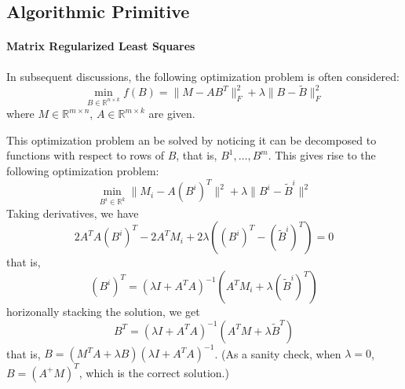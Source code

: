 \documentclass{article}
\def\R{\mathbb{R}}
\begin{document}
\subsection{Algorithmic Primitive}
\paragraph{Matrix Regularized Least Squares} In subsequent discussions, the following optimization problem is often considered:
\[ \min_{B \in \R^{n \times k}} f(B) = \| M - A B^T \|_F^2 + \lambda \| B - \tilde{B} \|_F^2 \]
where $M \in \R^{m \times n}$, $A \in \R^{m \times k}$ are given.

This optimization problem an be solved by noticing it can be decomposed to functions with
respect to rows of $B$, that is, $B^{1}, \ldots, B^{m}$.
This gives rise to the following optimization problem:
\[ \min_{B^i \in \R^k} \| M_i - A (B^i)^T \|^2 + \lambda \| B^i - \tilde B^i \|^2 \]
Taking derivatives, we have
\[ 2 A^T A (B^i)^T - 2 A^T M_i + 2 \lambda ((B^i)^T - (\tilde B^i)^T) = 0 \]
that is,
\[ (B^i)^T = (\lambda I + A^T A)^{-1} (A^T M_i + \lambda (\tilde B^i)^T ) \]
horizonally stacking the solution, we get
\[ B^T = (\lambda I + A^T A)^{-1} (A^T M + \lambda \tilde B^T) \]
that is, $B = (M^T A + \lambda B)(\lambda I + A^T A)^{-1}$.
(As a sanity check, when $\lambda = 0$, $B = (A^+ M)^T$, which is the correct solution.)
\end{document}
